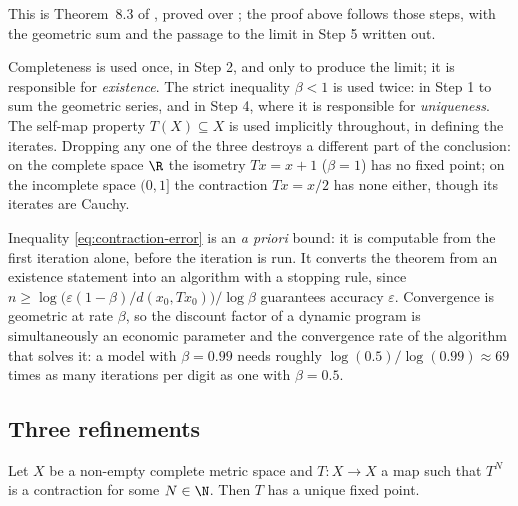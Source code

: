 This is Theorem~8.3 of \textcite[p.~284]{fukuda2026notes}, proved over
\autocite[slides 64--72]{fukuda2026analysis}; the proof above follows those
steps, with the geometric sum and the passage to the limit in Step 5 written out.

\begin{remark}\label{rem:contraction-hypotheses}
	Completeness is used once, in Step 2, and only to produce the limit; it is
	responsible for \emph{existence}. The strict inequality $\beta<1$ is used twice:
	in Step 1 to sum the geometric series, and in Step 4, where it is responsible for
	\emph{uniqueness}. The self-map property $T(X)\subseteq X$ is used implicitly
	throughout, in defining the iterates. Dropping any one of the three destroys a
	different part of the conclusion: on the complete space $\R$ the isometry
	$Tx=x+1$ ($\beta=1$) has no fixed point; on the incomplete space $(0,1]$ the
	contraction $Tx=x/2$ has none either, though its iterates are Cauchy.
\end{remark}

\begin{remark}
	\label{rem:error-bound}
	Inequality \eqref{eq:contraction-error} is an \emph{a priori} bound: it is
	computable from the first iteration alone, before the iteration is run. It
	converts the theorem from an existence statement into an algorithm with a stopping
	rule, since $n\geq\log\bigl(\varepsilon(1-\beta)/d(x_0,Tx_0)\bigr)/\log\beta$
	guarantees accuracy $\varepsilon$. Convergence is geometric at rate $\beta$, so
	the discount factor of a dynamic program is simultaneously an economic parameter
	and the convergence rate of the algorithm that solves it: a model with
	$\beta=0.99$ needs roughly $\log(0.5)/\log(0.99)\approx69$ times as many
	iterations per digit as one with $\beta=0.5$.
\end{remark}

\subsection{Three refinements}

\begin{corollary}\label{cor:power-contraction}
	Let $X$ be a non-empty complete metric space and $T\colon X\to X$ a map such
	that $T^N$ is a contraction for some $N\in\N$. Then $T$ has a unique fixed
	point.
\end{corollary}

